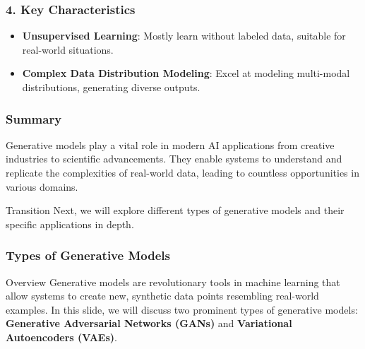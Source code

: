 \documentclass[aspectratio=169]{beamer}
\begin{document}
\begin{frame}[fragile]
    \frametitle{4. Key Characteristics}
    \begin{itemize}
        \item \textbf{Unsupervised Learning}: Mostly learn without labeled data, suitable for real-world situations.
        \item \textbf{Complex Data Distribution Modeling}: Excel at modeling multi-modal distributions, generating diverse outputs.
    \end{itemize}
\end{frame}

\begin{frame}[fragile]
    \frametitle{Summary}
    Generative models play a vital role in modern AI applications from creative industries to scientific advancements. They enable systems to understand and replicate the complexities of real-world data, leading to countless opportunities in various domains.
    
    \begin{block}{Transition}
        Next, we will explore different types of generative models and their specific applications in depth.
    \end{block}
\end{frame}

\begin{frame}[fragile]
    \frametitle{Types of Generative Models}
    
    \begin{block}{Overview}
        Generative models are revolutionary tools in machine learning that allow systems to create new, synthetic data points resembling real-world examples. In this slide, we will discuss two prominent types of generative models: \textbf{Generative Adversarial Networks (GANs)} and \textbf{Variational Autoencoders (VAEs)}.
    \end{block}
\end{frame}
\end{document}
